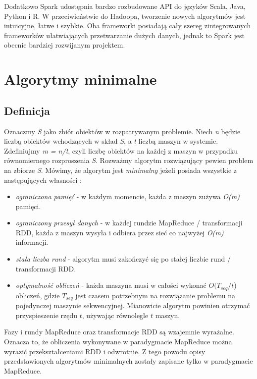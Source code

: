 \documentclass[licencjacka]{pracamgr}
\begin{document}
Dodatkowo Spark udostępnia bardzo rozbudowane API do języków Scala, Java, Python i R. W przeciwieństwie do Hadoopa, tworzenie nowych algorytmów jest intuicyjne, łatwe i szybkie. Oba frameworki posiadają cały szereg zintegrowanych frameworków ułatwiających przetwarzanie dużych danych, jednak to Spark jest obecnie bardziej rozwijanym projektem.

\chapter{Algorytmy minimalne}\label{algorytmy_minimalne}

\section{Definicja}

Oznaczmy \textit{S} jako zbiór obiektów w rozpatrywanym problemie. Niech \textit{n} będzie liczbą obiektów wchodzących w skład \textit{S}, a \textit{t} liczbą maszyn w systemie. Zdefiniujmy \textit{m = n/t}, czyli liczbę obiektów na każdej z maszyn w przypadku równomiernego rozproszenia \textit{S}. Rozważmy algorytm rozwiązujący pewien problem na zbiorze \textit{S}. Mówimy, że algorytm jest \textit{minimalny} jeżeli posiada wszystkie z następujących własności \cite{tao2013minimal}:
\begin{itemize}
    \item \textit{ograniczona pamięć} - w każdym momencie, każda z maszyn zużywa \textit{O(m)} pamięci.
    \item \textit{ograniczony przesył danych} - w każdej rundzie MapReduce / transformacji RDD, każda z maszyn wysyła i odbiera przez sieć co najwyżej \textit{O(m)} informacji.
    \item \textit{stała liczba rund} - algorytm musi zakończyć się po stałej liczbie rund / transformacji RDD.
    \item \textit{optymalność obliczeń} - każda maszyna musi w całości wykonać \(O(T_{seq} / t\)) obliczeń, gdzie \(T_{seq}\) jest czasem potrzebnym na rozwiązanie problemu na pojedynczej maszynie sekwencyjnej. Mianowicie algorytm powinien otrzymać przyspieszenie rzędu \(t\), używając równolegle \(t\) maszyn.
\end{itemize}

Fazy i rundy MapReduce oraz transformacje RDD są wzajemnie wyrażalne. Oznacza to, że obliczenia wykonywane w paradygmacie MapReduce można wyrazić przekształceniami RDD i odwrotnie. Z tego powodu opisy przedstawionych algorytmów minimalnych zostały zapisane tylko w paradygmacie MapReduce.
\end{document}
